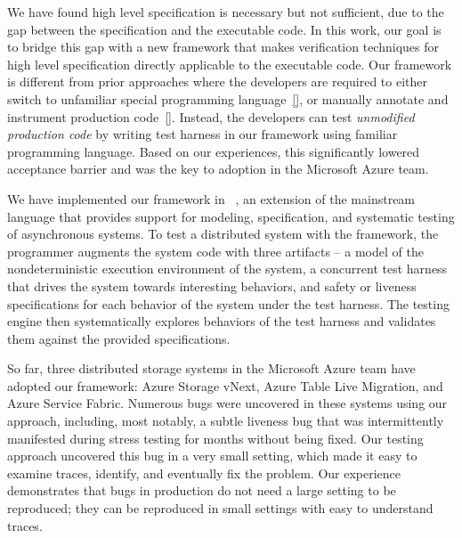 We have found high level specification is necessary but not sufficient, due to the gap between the specification and the executable code.
In this work, our goal is to bridge this gap with a new framework that makes verification techniques for high level specification directly applicable to the executable code. Our framework is different from prior approaches where the developers are required to either switch to unfamiliar special programming language~\ref{}, or manually annotate and instrument production code~\ref{}. Instead, the developers can test {\em unmodified production code} by writing test harness in our framework using familiar programming language. Based on our experiences, this significantly lowered acceptance barrier and was the key to adoption in the Microsoft Azure team.

We have implemented our framework in \psharp~\cite{deligiannis2015psharp}, an extension of the mainstream language \csharp that provides support for modeling, specification, and systematic testing of asynchronous systems.
To test a distributed system with the \psharp framework, the programmer augments the system code with three artifacts -- a model of the nondeterministic execution environment of the system, a concurrent test harness that drives the system towards interesting behaviors, and safety or liveness specifications for each behavior of the system under the test harness.
The \psharp testing engine then systematically explores behaviors of the test harness and validates them against the provided specifications.

So far, three distributed storage systems in the Microsoft Azure team have adopted our framework: Azure Storage vNext, Azure Table Live Migration, and Azure Service Fabric.
Numerous bugs were uncovered in these systems using our approach,
including, most notably, a subtle liveness bug that was intermittently manifested during stress testing for months without being fixed.
Our testing approach uncovered this bug in a very small setting, which made it easy to examine traces, identify, and eventually fix the problem.
Our experience demonstrates that bugs in production do not need a large setting to be reproduced;
they can be reproduced in small settings with easy to understand traces.

